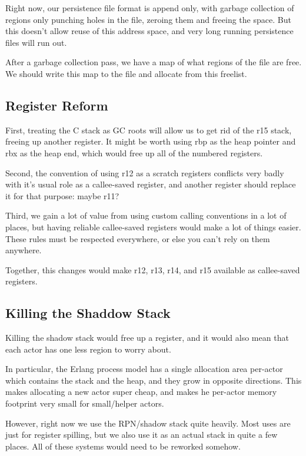 Right now, our persistence file format is append only, with garbage collection
of regions only punching holes in the file, zeroing them and freeing the
space. But this doesn't allow reuse of this address space, and very long
running persistence files will run out.

After a garbage collection pass, we have a map of what regions of the file are
free. We should write this map to the file and allocate from this freelist.

\subsection{Register Reform}

First, treating the C stack as GC roots will allow us to get rid of the
r15 stack, freeing up another register.  It might be worth using rbp
as the heap pointer and rbx as the heap end, which would free up all of
the numbered registers.

Second, the convention of using r12 as a scratch registers conflicts
very badly with it's usual role as a callee-saved register, and another
register should replace it for that purpose: maybe r11?

Third, we gain a lot of value from using custom calling conventions
in a lot of places, but having reliable callee-saved registers would
make a lot of things easier.  These rules must be respected everywhere,
or else you can't rely on them anywhere.

Together, this changes would make r12, r13, r14, and r15 available as
callee-saved registers.

\subsection{Killing the Shaddow Stack}

Killing the shadow stack would free up a register, and it would also
mean that each actor has one less region to worry about.

In particular, the Erlang process model has a single allocation area
per-actor which contains the stack and the heap, and they grow in opposite
directions.  This makes allocating a new actor super cheap, and makes
he per-actor memory footprint very small for small/helper actors.

However, right now we use the RPN/shadow stack quite heavily.  Most uses
are just for register spilling, but we also use it as an actual stack
in quite a few places. All of these systems would need to be reworked
somehow.

